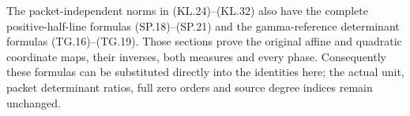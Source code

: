 The packet-independent norms in (KL.24)--(KL.32) also have the
complete positive-half-line formulas (SP.18)--(SP.21) and the
gamma-reference determinant formulas (TG.16)--(TG.19). Those
sections prove the original affine and quadratic coordinate maps,
their inverses, both measures and every phase. Consequently these
formulas can be substituted directly into the identities here;
the actual unit, packet determinant ratios, full zero orders and
source degree indices remain unchanged.
